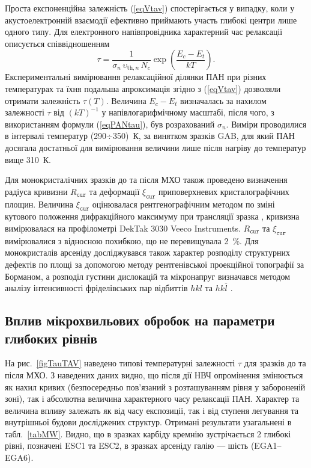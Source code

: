 Проста експоненційна залежність (\ref{eqVtav}) спостерігається у випадку, коли у акустоелектронній взаємодії ефективно приймають участь глибокі центри лише одного типу.
Для електронного напівпровідника характерний час релаксації описується співвідношенням \cite{Saiko1993,Rzanov,OstrovPAN}
\begin{equation}\label{eqPANtau}
  \tau=\frac{1}{\sigma_n\,\upsilon_{\mathrm{th},n}\,N_c}\exp\left(\frac{E_c-E_t}{kT}\right).
\end{equation}
Експериментальні вимірювання релаксаційної ділянки ПАН при різних температурах та їхня подальша апроксимація згідно з (\ref{eqVtav}) дозволяли отримати
залежність $\tau(T)$.
Величина $E_c-E_t$ визначалась за нахилом залежності $\tau$ від $(kT)^{-1}$ у напівлогарифмічному масштабі, після чого, з використанням формули (\ref{eqPANtau}),
був розрахований $\sigma_n$.
Виміри проводилися в інтервалі температур (290$\div$350)~К,
за винятком зразків GAB, для який ПАН досягала достатньої для вимірювання величини лише після нагріву до температур вище 310~К.

Для монокристалічних зразків до та після МХО також проведено визначення радіуса кривизни $R_\mathtt{cur}$ та
деформації $\xi_\mathtt{cur}$ приповерхневих кристалографічних площин.
Величина $\xi_\mathtt{cur}$ оцінювалася рентгенографічним методом по зміні кутового положення дифракційного максимуму при трансляції зразка \cite{Godwod},
кривизна вимірювалася на профілометрі DekTak 3030 Veeco Instruments.
$R_\mathtt{cur}$ та $\xi_\mathtt{cur}$ вимірювалися  з відносною похибкою, що не перевищувала 2~\%.
Для монокристалів арсеніду досліджувався також характер розподілу структурних дефектів по площі за допомогою методу
рентгенівської проекційної топографії за Борманом,
а розподіл густини дислокацій та мікронапруг визначався методом аналізу інтенсивності фріделівських пар відбиттів $hkl$ та $hk\overline{l}$ \cite{ThoricBook}.


\subsection{Вплив мікрохвильових обробок на параметри глибоких рівнів}

На рис.~\ref{figTauTAV} наведено типові температурні залежності $\tau$ для зразків до та після МХО.
З наведених даних видно, що після дії НВЧ опромінення змінюється як нахил кривих (безпосередньо пов'язаний
з розташуванням рівня у забороненій зоні), так і абсолютна величина характерного часу релаксації ПАН.
Характер та величина впливу залежать як від часу експозиції, так і від ступеня легування та внутрішньої будови
досліджених структур.
Отримані результати узагальнені в табл.~\ref{tabMW}.
Видно, що в зразках карбіду кремнію зустрічається 2 глибокі рівні, позначені ESC1 та ESC2,
в зразках арсеніду галію --- шість (EGA1--EGA6).


